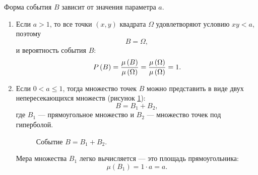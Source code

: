 Форма события $B$ зависит от значения параметра $a$.
\begin{enumerate}
    \item
    Если $a > 1$, то все точки $(x,y)$ квадрата $\Omega$ удовлетворяют условию $x y < a$, поэтому
    \begin{equation}
        B = \Omega,
    \end{equation}
    и вероятность события $B$:
    \begin{equation}
        P \left ( B \right )
        = \frac{\mu \left ( B \right )}{\mu \left ( \Omega \right )}
        = \frac{\mu \left ( \Omega \right )}{\mu \left ( \Omega \right )}
        = 1 .
    \end{equation}

    \item
    Если $0 < a \le 1$, тогда множество точек $B$ можно представить в виде двух непересекающихся множеств (рисунок \ref{figure:lesson_3:40:B}):
    \begin{equation}
        B = B_1 + B_2 ,
    \end{equation}
    где $B_1$ --- прямоугольное множество и $B_2$ --- множество точек под гиперболой.

    \begin{figure}[h]
        \centering
        \caption{Событие $B = B_1 + B_2$.}
        \label{figure:lesson_3:40:B}
    \end{figure}

    Мера множества $B_1$ легко вычисляется --- это площадь прямоугольника:
    \begin{equation}
        \mu \left ( B_1 \right )
        = 1 \cdot a
        = a .
    \end{equation}


\end{enumerate}
